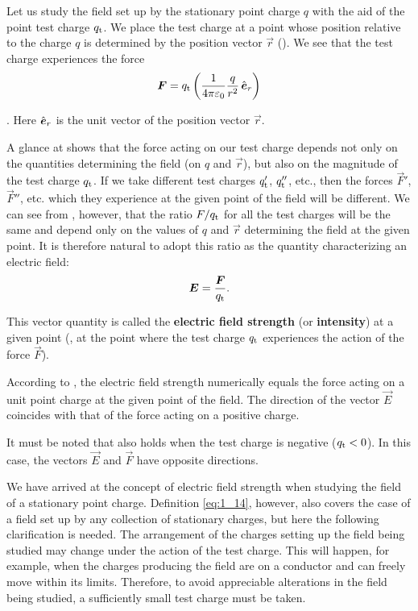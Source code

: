 Let us study the field set up by the stationary point charge $q$ with the aid of the point test charge $q_{\text{t}}$. We place the test charge at a point whose position relative to the charge $q$ is determined by the position vector $\vec{r}$ (). We see that the test charge experiences the force
\begin{equation}\label{eq:1_13}
	\boldsymbol{F} = q_{\text{t}} \left(
	\frac{1}{4\pi\varepsilon_0} \frac{q}{r^2}\,\hat{\boldsymbol{e}}_{r}
	\right)
\end{equation}

. Here $\hat{\boldsymbol{e}}_{r}$ is the unit vector of the position vector $\vec{r}$.

A glance at  shows that the force acting on our test charge depends not only on the quantities determining the field (on $q$ and $\vec{r}$), but also on the magnitude of the test charge $q_{\text{t}}$. If we take different test charges $q_{\text{t}}'$, $q_{\text{t}}''$, etc., then the forces $\vec{F}'$, $\vec{F}''$, etc. which they experience at the given point of the field will be different.
We can see from , however, that the ratio $F/q_{\text{t}}$ for all the test charges will be the same and depend only on the values of $q$ and $\vec{r}$ determining the field at the given point. It is therefore natural to adopt this ratio as the quantity characterizing an electric field:
\begin{equation}\label{eq:1_14}
	\boldsymbol{E} = \frac{\boldsymbol{F}}{q_{\text{t}}}.
\end{equation}

\noindent
This vector quantity is called the \textbf{electric field strength} (or \textbf{intensity}) at a given point (\ie, at the point where the test charge $q_{\text{t}}$ experiences the action of the force $\vec{F}$).

According to , the electric field strength numerically equals the force acting on a unit point charge at the given point of the field. The direction of the vector $\vec{E}$ coincides with that of the force acting on a positive charge.

It must be noted that  also holds when the test charge is negative ($q_{\text{t}}<0$). In this case, the vectors $\vec{E}$ and $\vec{F}$ have opposite directions.

We have arrived at the concept of electric field strength when studying the field of a stationary point charge. Definition \eqref{eq:1_14}, however, also covers the case of a field set up by any collection of stationary charges, but here the following clarification is needed. The arrangement of the charges setting up the field being studied may change under the action of the test charge. This will happen, for example, when the charges producing the field are on a conductor and can freely move within its limits. Therefore, to avoid appreciable alterations in the field being studied, a sufficiently small test charge must be taken.

